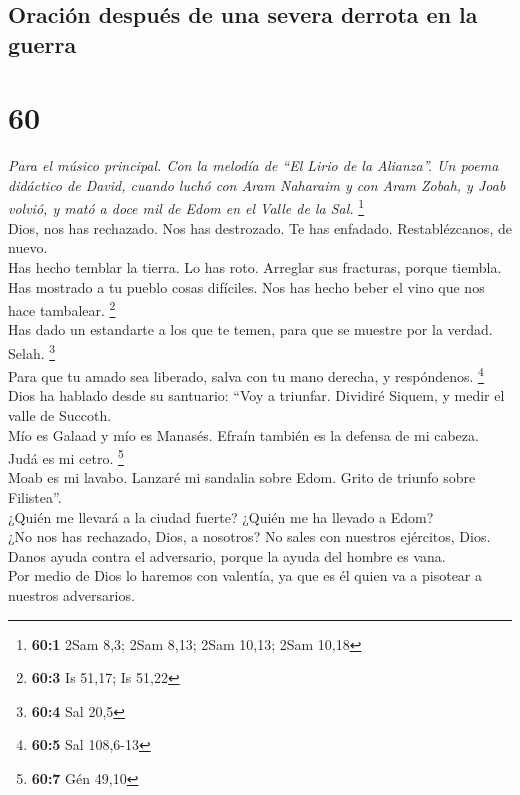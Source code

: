 \hypertarget{oraciuxf3n-despuuxe9s-de-una-severa-derrota-en-la-guerra}{%
\subsection{Oración después de una severa derrota en la
guerra}\label{oraciuxf3n-despuuxe9s-de-una-severa-derrota-en-la-guerra}}

\hypertarget{section-58}{%
\section{60}\label{section-58}}

\emph{Para el músico principal. Con la melodía de ``El Lirio de la
Alianza''. Un poema didáctico de David, cuando luchó con Aram Naharaim y
con Aram Zobah, y Joab volvió, y mató a doce mil de Edom en el Valle de
la Sal.} \footnote{\textbf{60:1} 2Sam 8,3; 2Sam 8,13; 2Sam 10,13; 2Sam
  10,18}\\
 Dios, nos has rechazado. Nos has destrozado. Te has
enfadado. Restablézcanos, de nuevo.\\
 Has hecho temblar la tierra. Lo has roto. Arreglar sus
fracturas, porque tiembla.\\
 Has mostrado a tu pueblo cosas difíciles. Nos has hecho
beber el vino que nos hace tambalear. \footnote{\textbf{60:3} Is 51,17;
  Is 51,22}\\
 Has dado un estandarte a los que te temen, para que se
muestre por la verdad. Selah. \footnote{\textbf{60:4} Sal 20,5}\\
 Para que tu amado sea liberado, salva con tu mano
derecha, y respóndenos. \footnote{\textbf{60:5} Sal 108,6-13}\\
 Dios ha hablado desde su santuario: ``Voy a triunfar.
Dividiré Siquem, y medir el valle de Succoth.\\
 Mío es Galaad y mío es Manasés. Efraín también es la
defensa de mi cabeza. Judá es mi cetro. \footnote{\textbf{60:7} Gén
  49,10}\\
 Moab es mi lavabo. Lanzaré mi sandalia sobre Edom. Grito
de triunfo sobre Filistea''.\\
 ¿Quién me llevará a la ciudad fuerte? ¿Quién me ha
llevado a Edom?\\
 ¿No nos has rechazado, Dios, a nosotros? No sales con
nuestros ejércitos, Dios.\\
 Danos ayuda contra el adversario, porque la ayuda del
hombre es vana.\\
 Por medio de Dios lo haremos con valentía, ya que es él
quien va a pisotear a nuestros adversarios.

